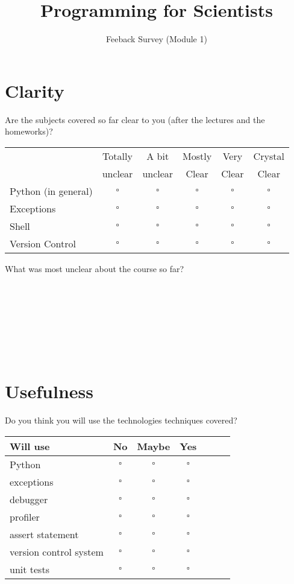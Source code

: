 \documentclass[article,twoside]{memoir}
\author{Feeback Survey (Module 1)}
\title{Programming for Scientists}
\newcommand*{\fillunderscore}{~\hrulefill}
\newcommand*{\checkbox}{$\square$}
\def\th#1{#1}
\begin{document}
\maketitle


\chapter{Clarity}
Are the subjects covered so far clear to you (after the lectures and the homeworks)?

\begin{center}
\begin{tabular}{lccccc}
 \toprule
 & \th{Totally }         & \th{A bit} & \th{Mostly}    & \th{Very} & \th{Crystal}\\
 & \th{unclear}         & \th{unclear} & \th{Clear}    & \th{Clear} & \th{Clear}\\
 \midrule
Python (in general)     &\checkbox &\checkbox &\checkbox &\checkbox &\checkbox \\
Exceptions              &\checkbox &\checkbox &\checkbox &\checkbox &\checkbox \\
Shell                   &\checkbox &\checkbox &\checkbox &\checkbox &\checkbox \\
Version Control         &\checkbox &\checkbox &\checkbox &\checkbox &\checkbox \\
\bottomrule
\end{tabular}
\end{center}

What was most unclear about the course so far? \fillunderscore\par\smallskip
\fillunderscore\par\smallskip
\fillunderscore\par\smallskip
\fillunderscore\par\smallskip
\fillunderscore


\chapter{Usefulness}
Do you think you will use the technologies techniques covered?

\begin{center}
\begin{tabular}{lcccccc}
 \toprule
Will use & \th{No} & \th{Maybe}            & \th{Yes} \\
 \midrule
Python                     &\checkbox &\checkbox &\checkbox \\
exceptions                 &\checkbox &\checkbox &\checkbox \\
debugger                   &\checkbox &\checkbox &\checkbox \\
profiler                   &\checkbox &\checkbox &\checkbox \\
assert statement           &\checkbox &\checkbox &\checkbox \\
version control system     &\checkbox &\checkbox &\checkbox \\
unit tests                 &\checkbox &\checkbox &\checkbox \\
\bottomrule
\end{tabular}
\end{center}
\end{document}
